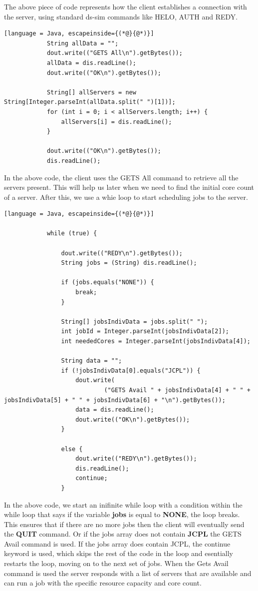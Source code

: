 \documentclass[a4paper]{article} %
\begin{document}
The above piece of code represents how the client establishes a connection with the server, using standard 
ds-sim commands like HELO, AUTH and REDY. \\

\begin{lstlisting}[language = Java, escapeinside={(*@}{@*)}]
			String allData = "";
			dout.write(("GETS All\n").getBytes());
			allData = dis.readLine();
			dout.write(("OK\n").getBytes());

			String[] allServers = new String[Integer.parseInt(allData.split(" ")[1])];
			for (int i = 0; i < allServers.length; i++) {
				allServers[i] = dis.readLine();
			}

			dout.write(("OK\n").getBytes());
			dis.readLine();

\end{lstlisting}
In the above code, the client uses the GETS All command to retrieve all the servers present. This will help us later 
when we need to find the initial core count of a server. After this, we use a whie loop to start scheduling jobs to the server.\\

\begin{lstlisting}[language = Java, escapeinside={(*@}{@*)}]

			while (true) {

				dout.write(("REDY\n").getBytes());
				String jobs = (String) dis.readLine();

				if (jobs.equals("NONE")) {
					break;
				}

				String[] jobsIndivData = jobs.split(" ");
				int jobId = Integer.parseInt(jobsIndivData[2]);
				int neededCores = Integer.parseInt(jobsIndivData[4]);

				String data = "";
				if (!jobsIndivData[0].equals("JCPL")) {
					dout.write(
							("GETS Avail " + jobsIndivData[4] + " " + jobsIndivData[5] + " " + jobsIndivData[6] + "\n").getBytes());
					data = dis.readLine();
					dout.write(("OK\n").getBytes());
				}

				else {
					dout.write(("REDY\n").getBytes());
					dis.readLine();
					continue;
				}
\end{lstlisting}
In the above code, we start an inifinite while loop with a condition within the while loop that says if the variable 
\textbf{jobs} is equal to \textbf{NONE}, the loop breaks. This ensures that if there are no more jobs then the client will eventually
send the \textbf{QUIT} command. Or if the jobs array does not contain \textbf{JCPL} the GETS Avail command is used. If the jobs array 
does contain JCPL, the continue keyword is used, which skips the rest of the code in the loop and esentially restarts the loop, moving on 
to the next set of jobs. When the Gets Avail command is used the server responds with a list of servers that are available and can 
run a job with the specific resource capacity and core count.\\
\end{document}
